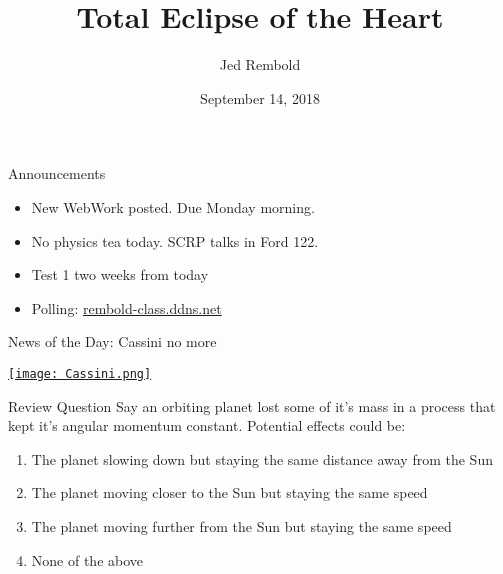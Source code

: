\documentclass[pdf, aspectratio=169]{beamer}
\title{Total Eclipse of the Heart}
\date{September 14, 2018}
\author{Jed Rembold}
\begin{document}
\renewcommand*{\theenumi}{\Alph{enumi}}

\begin{frame}{Announcements}
	\begin{itemize}
		\item New WebWork posted. Due Monday morning.
		\item No physics tea today. SCRP talks in Ford 122.
		\item Test 1 two weeks from today
		\item Polling: \url{rembold-class.ddns.net}
	\end{itemize}
\end{frame}

\begin{frame}{News of the Day: Cassini no more}
  \begin{center}
	  \href{https://www.youtube.com/watch?list=PLTiv_XWHnOZpKPaDTVy36z0U8GxoiIkZa&v=xrGAQCq9BMU}{\texttt{[image: Cassini.png]}}
  \end{center}
  
\end{frame}


\begin{frame}{Review Question}
	Say an orbiting planet lost some of it's mass in a process that kept it's angular momentum constant. Potential effects could be:
	\begin{enumerate}
		\item The planet slowing down but staying the same distance away from the Sun
		\item The planet moving closer to the Sun but staying the same speed
		\item \alert<2>{The planet moving further from the Sun but staying the same speed}
		\item None of the above
	\end{enumerate}
\end{frame}
\end{document}
